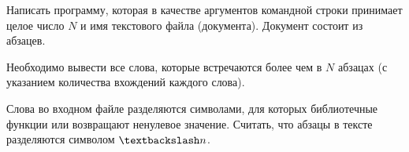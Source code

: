 
Написать программу, которая в качестве аргументов командной строки
принимает целое число $N$ и имя текстового файла (документа). Документ
состоит из абзацев.

Необходимо вывести все слова, которые встречаются
более чем в $N$ абзацах (с указанием количества вхождений каждого слова).

Слова во входном файле разделяются символами, для которых
библиотечные функции  или  возвращают ненулевое
значение. Считать, что абзацы в тексте разделяются символом $\textbackslash n$.
